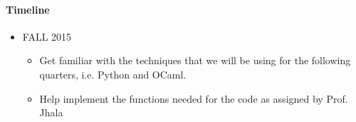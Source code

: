 \documentclass[dvips,12pt]{article}
\begin{document}
\paragraph{Timeline}

\begin{itemize} 
	\item FALL 2015
	
	\begin{itemize}
		\item Get familiar with the techniques that we will be using for the following quarters, i.e. Python and OCaml.
		\item Help implement the functions needed for the code as assigned by Prof. Jhala
	\end{itemize}

\end{itemize}
\end{document}
